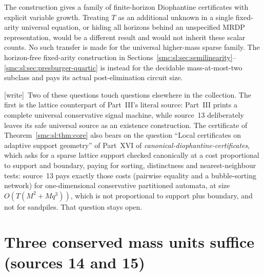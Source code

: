 \documentclass[11pt,letterpaper]{article}
\numberwithin{equation}{section}
\theoremstyle{definition}
\theoremstyle{remark}
\newcommand{\wtag}{\textup{[write]}}
\begin{document}
The construction gives a family of finite-horizon Diophantine certificates with explicit variable growth. Treating $T$ as an additional unknown in a single fixed-arity universal equation, or hiding all horizons behind an unspecified MRDP representation, would be a different result and would not inherit these scalar counts. No such transfer is made for the universal higher-mass sparse family. The horizon-free fixed-arity construction in Sections~\ref{smc:sl:sec:semilinearity}--\ref{smc:sl:sec:presburger-quartic} is instead for the decidable mass-at-most-two subclass and pays its actual post-elimination circuit size.

\wtag\ Two of these questions touch questions elsewhere in the collection. The first is the lattice counterpart of Part~III's literal source: Part~III prints a complete universal conservative signal machine, while source~13 deliberately leaves its safe universal source as an existence construction. The certificate of Theorem~\ref{smc:sl:thm:core} also bears on the question ``Local certificates on adaptive support geometry'' of Part~XVI of \emph{canonical-diophantine-certificates}, which asks for a sparse lattice support checked canonically at a cost proportional to support and boundary, paying for sorting, distinctness and nearest-neighbour tests: source~13 pays exactly those costs (pairwise equality and a bubble-sorting network) for one-dimensional conservative partitioned automata, at size $O(T(M^2+Mq^3))$, which is not proportional to support plus boundary, and not for sandpiles. That question stays open.

\part{Three conserved mass units suffice (sources 14 and 15)}\label{smc:tm:part}
\end{document}
